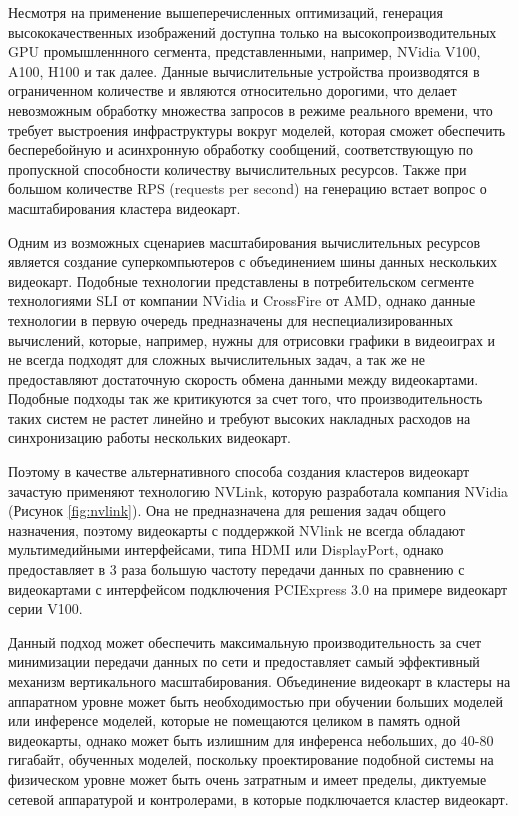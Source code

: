 Несмотря на применение вышеперечисленных оптимизаций,
генерация высококачественных изображений доступна только на высокопроизводительных GPU промышленнного сегмента,
представленными, например, NVidia V100, A100, H100 и так далее. 
Данные вычислительные устройства производятся в ограниченном количестве и являются относительно дорогими,
что делает невозможным обработку множества запросов в режиме реального времени, что требует выстроения инфраструктуры
вокруг моделей, которая сможет обеспечить бесперебойную и асинхронную обработку сообщений, 
соответствующую по пропускной способности количеству вычислительных ресурсов.
Также при большом количестве RPS (requests per second) на генерацию встает вопрос о масштабирования кластера
видеокарт. 

Одним из возможных сценариев масштабирования вычислительных ресурсов является создание суперкомпьютеров с объединением
шины данных нескольких видеокарт. Подобные технологии представлены в потребительском сегменте технологиями SLI от компании NVidia и CrossFire от AMD, однако
данные технологии в первую очередь предназначены для неспециализированных вычислений, которые, например, нужны для
отрисовки графики в видеоиграх и не всегда подходят для сложных вычислительных задач, а так же не предоставляют достаточную скорость
обмена данными между видеокартами. Подобные подходы так же критикуются за счет того, что производительность таких систем не растет линейно и
требуют высоких накладных расходов на синхронизацию работы нескольких видеокарт.

Поэтому в качестве альтернативного способа создания кластеров видеокарт зачастую применяют технологию NVLink, которую разработала 
компания NVidia (Рисунок \ref{fig:nvlink}). Она не предназначена для решения задач общего назначения, поэтому видеокарты с поддержкой NVlink не всегда обладают 
мультимедийными интерфейсами, типа HDMI или DisplayPort, однако предоставляет в 3 раза большую частоту передачи данных
по сравнению с видеокартами с интерфейсом подключения PCIExpress 3.0 на примере видеокарт серии V100.

Данный подход может обеспечить максимальную производительность за счет минимизации передачи данных по сети
и предоставляет самый эффективный механизм вертикального масштабирования. Объединение видеокарт в кластеры на аппаратном
уровне может быть необходимостью при обучении больших моделей или инференсе моделей, которые не помещаются целиком
в память одной видеокарты, однако может быть излишним для инференса небольших, до 40-80 гигабайт, обученных моделей,
поскольку проектирование подобной системы на физическом уровне может быть очень затратным и имеет пределы, диктуемые
сетевой аппаратурой и контролерами, в которые подключается кластер видеокарт.

